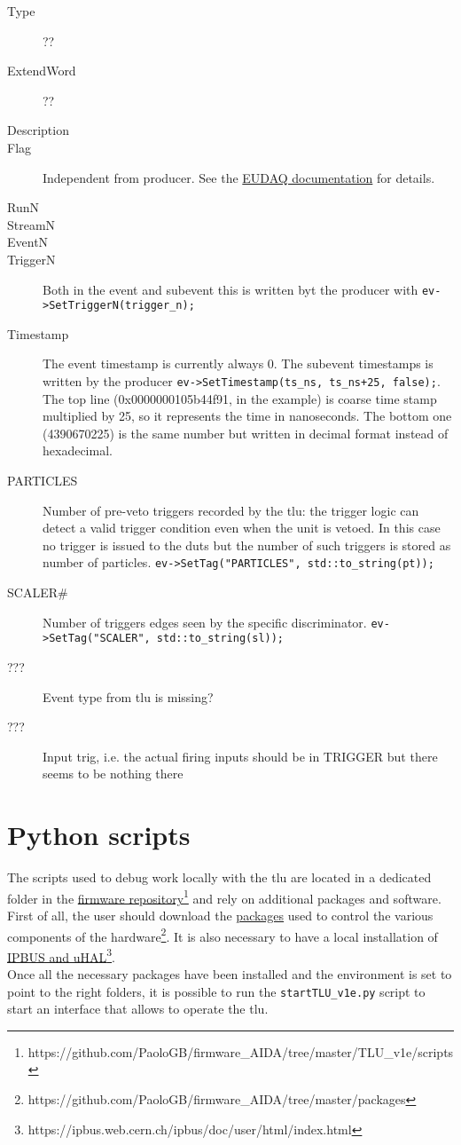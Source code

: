 \begin{description}
  \item[Type] ??
  \item[ExtendWord] ??
  \item[Description]
  \item[Flag] Independent from producer. See the \href{https://github.com/eudaq/eudaq/blob/master/main/lib/core/include/eudaq/Event.hh#L87}{EUDAQ documentation} for details.
  \item[RunN]
  \item[StreamN]
  \item[EventN]
  \item[TriggerN] Both in the event and subevent this is written byt the producer with \verb|ev->SetTriggerN(trigger_n);|
  \item[Timestamp] The event timestamp is currently always 0. The subevent timestamps is written by the producer \verb|ev->SetTimestamp(ts_ns, ts_ns+25, false);|. The top line (0x0000000105b44f91, in the example) is coarse time stamp multiplied by 25, so it represents the time in nanoseconds. The bottom one (4390670225) is the same number but written in decimal format instead of hexadecimal.
  \item[PARTICLES] Number of pre-veto triggers recorded by the \gls{tlu}: the trigger logic can detect a valid trigger condition even when the unit is vetoed. In this case no trigger is issued to the \gls{dut}s but the number of such triggers is stored as number of particles. \verb|ev->SetTag("PARTICLES", std::to_string(pt));|
  \item[SCALER\#] Number of triggers edges seen by the specific discriminator. \verb|ev->SetTag("SCALER", std::to_string(sl));|
  \item[???] Event type from \gls{tlu} is missing?
  \item[???] Input trig, i.e. the actual firing inputs should be in TRIGGER but there seems to be nothing there
\end{description}

\section{Python scripts}
The scripts used to debug work locally with the \gls{tlu} are located in a dedicated folder in the \href{https://github.com/PaoloGB/firmware_AIDA/tree/master/TLU_v1e/scripts}{firmware repository}\footnote{https://github.com/PaoloGB/firmware\_AIDA/tree/master/TLU\_v1e/scripts} and rely on additional packages and software.
First of all, the user should download the \href{https://github.com/PaoloGB/firmware_AIDA/tree/master/packages}{packages} used to control the various components of the hardware\footnote{https://github.com/PaoloGB/firmware\_AIDA/tree/master/packages}. It is also necessary to have a local installation of \href{https://ipbus.web.cern.ch/ipbus/doc/user/html/index.html}{IPBUS and uHAL}\footnote{https://ipbus.web.cern.ch/ipbus/doc/user/html/index.html}.\\
Once all the necessary packages have been installed and the environment is set to point to the right folders, it is possible to run the \verb|startTLU_v1e.py| script to start an interface that allows to operate the \gls{tlu}.
 